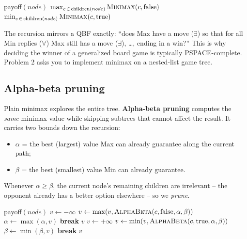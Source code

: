 \documentclass[11pt]{article}
\begin{document}
\begin{algorithm}[h]
\caption{Minimax (value for the player to move)}
\begin{algorithmic}[1]
     \Return payoff$(node)$ \EndIf
        \State \Return $\max_{c \,\in\, \text{children}(node)} \textsc{Minimax}(c, \text{false})$
    \Else
        \State \Return $\min_{c \,\in\, \text{children}(node)} \textsc{Minimax}(c, \text{true})$
    \EndIf
\EndFunction
\end{algorithmic}
\end{algorithm}

The recursion mirrors a QBF exactly: ``does Max have a move ($\exists$) so that
for all Min replies ($\forall$) Max still has a move ($\exists$), \dots,
ending in a win?'' This is why deciding the winner of a generalized board game
is typically PSPACE-complete. Problem 2 asks you to implement minimax on a
nested-list game tree.

\subsection{Alpha-beta pruning}

Plain minimax explores the entire tree. \textbf{Alpha-beta pruning} computes
the \emph{same} minimax value while skipping subtrees that cannot affect the
result. It carries two bounds down the recursion:
\begin{itemize}
    \item $\alpha$ = the best (largest) value Max can already guarantee along
    the current path;
    \item $\beta$ = the best (smallest) value Min can already guarantee.
\end{itemize}
Whenever $\alpha \ge \beta$, the current node's remaining children are
irrelevant -- the opponent already has a better option elsewhere -- so we
\emph{prune}.

\begin{algorithm}[h]
\caption{Alpha-Beta Pruning}
\begin{algorithmic}[1]
     \Return payoff$(node)$ \EndIf
        \State $v \gets -\infty$
            \State $v \gets \max(v, \textsc{AlphaBeta}(c, \text{false}, \alpha, \beta))$
            \State $\alpha \gets \max(\alpha, v)$
            \If{$\alpha \ge \beta$} \textbf{break}  \EndIf
        \EndFor
        \State \Return $v$
    \Else
        \State $v \gets +\infty$
            \State $v \gets \min(v, \textsc{AlphaBeta}(c, \text{true}, \alpha, \beta))$
            \State $\beta \gets \min(\beta, v)$
            \If{$\beta \le \alpha$} \textbf{break}  \EndIf
        \EndFor
        \State \Return $v$
    \EndIf
\EndFunction
\end{algorithmic}
\end{algorithm}
\end{document}
